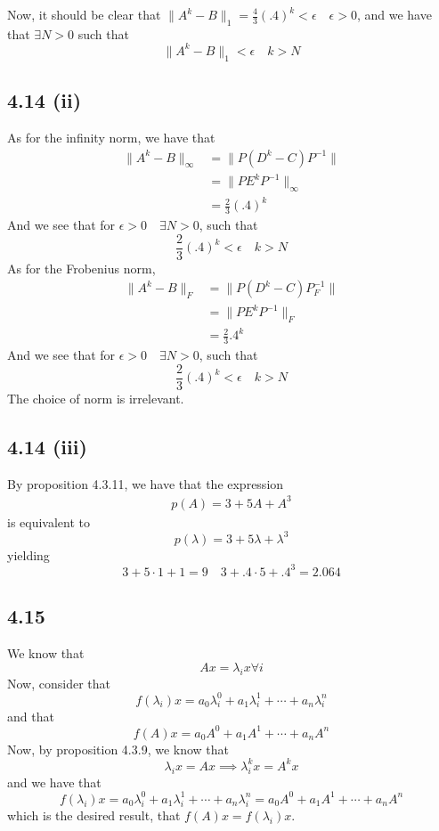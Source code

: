 \documentclass[letterpaper,12pt]{article}
\theoremstyle{definition}
\begin{document}
Now, it should be clear that $\|A^k - B\|_1 = \frac{4}{3}(.4)^k < \epsilon \quad \epsilon > 0$, and we have that $\exists N >0$ such that 
\[\|A^k - B\|_1 < \epsilon \quad k > N\]
        \subsection*{4.14 (ii)}
        
    As for the infinity norm, we have that 
        \begin{align*}
            \|A^k - B\|_{\infty} & = \|P(D^k - C)P^{-1}\|\\
            & = \|PE^kP^{-1}\|_{\infty} \\
            & = \frac{2}{3}(.4)^k
        \end{align*}
        And we see that for $\epsilon > 0 \quad \exists N >0$, such that   
        \[ \frac{2}{3}(.4)^k < \epsilon \quad k > N\]
        As for the Frobenius norm, 
        \begin{align*}
            \|A^k - B\|_{F} & = \|P(D^k - C)P^{-1}_F\|\\
            & = \|PE^kP^{-1}\|_{F} \\
            & = \frac{2}{3}.4^k
        \end{align*}
        And we see that for $\epsilon > 0 \quad \exists N >0$, such that   
        \[ \frac{2}{3}(.4)^k < \epsilon \quad k > N\]
        The choice of norm is irrelevant.
    \subsection*{4.14 (iii)}
    
    
        By proposition 4.3.11, we have that the expression
        \begin{align*}
            p(A) = 3 + 5A + A^3
        \end{align*}
        is equivalent to 
        \[p(\lambda) = 3 + 5\lambda + \lambda^3\]
        yielding 
        \[3 + 5\cdot 1 + 1 = 9\quad 3 + .4\cdot5 + .4^3 = 2.064\]

\subsection*{4.15}
We know that 
\[Ax = \lambda_i x \forall i\]
Now, consider that
\[f(\lambda_i)x = a_0\lambda_i^0 + a_1\lambda_i^1 + \cdots +a_n\lambda_i^n \] 
and that
\[f(A)x = a_0A^0 + a_1A^1 + \cdots +a_nA^n \] 
Now, by proposition 4.3.9, we know that 
\[ \lambda_i x = A x \implies \lambda_i^k x = A^k x \]
and we have that
\[f(\lambda_i)x = a_0\lambda_i^0 + a_1\lambda_i^1 + \cdots +a_n\lambda_i^n 
=
 a_0A^0 + a_1A^1 + \cdots +a_nA^n 
\] 
which is the desired result, that $f(A)x = f(\lambda_i)x$.
\end{document}
